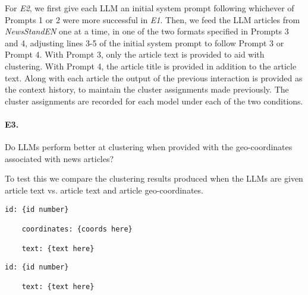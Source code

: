 For \emph{E2}, we first give each LLM an initial system prompt following whichever of Prompts 1 or 2 were more successful in \emph{E1}.
Then, we feed the LLM articles from \emph{NewsStandEN} one at a time, in one of the two formats specified in Prompts 3 and 4, adjusting lines 3-5 of the initial system prompt to follow Prompt 3 or Prompt 4. 
With Prompt 3, only the article text is provided to aid with clustering.
With Prompt 4, the article title is provided in addition to the article text.
Along with each article the output of the previous interaction is provided as the context history, to maintain the cluster assignments made previously.
The cluster assignments are recorded for each model under each of the two conditions.

    
    


\paragraph{\textbf{E3.}}
Do LLMs perform better at clustering when provided with the geo-coordinates associated with news articles? 

\noindent To test this we compare the clustering results produced when the LLMs are given article text vs. article text and article geo-coordinates. 
    
\begin{lstlisting}[title=Prompt 5: Geo-coords Prompt]
    id: {id number}
    
    coordinates: {coords here}

    text: {text here}
    \end{lstlisting}
    \begin{lstlisting}[title=Prompt 6: No Geo-coords Prompt]
    id: {id number}

    text: {text here}
\end{lstlisting}

